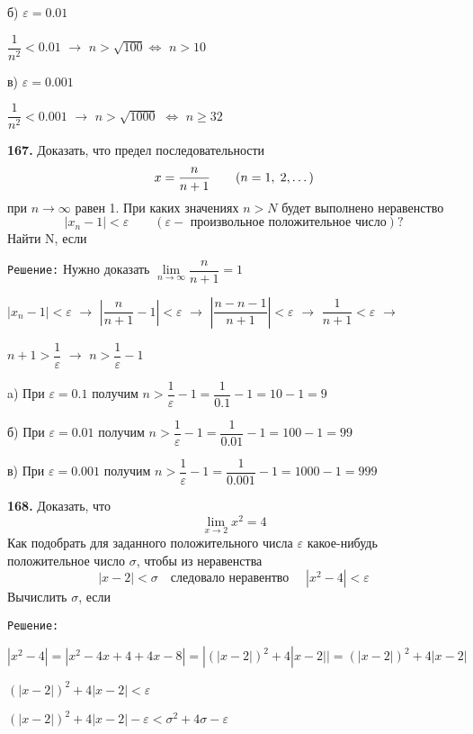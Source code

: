 \documentclass[12pt]{article}
\begin{document}
	\quad б) $\varepsilon = 0.01$
	
	\qquad $\dfrac{1}{n^2}<0.01$ $\longrightarrow$ $n>\sqrt{100}$\hspace{2mm}$\Leftrightarrow$ $n>10$\medskip
	
	\quad в) $ \varepsilon = 0.001$
	
	\qquad $\dfrac{1}{n^2}<0.001$ $\longrightarrow$ $n>\sqrt{1000}$ \hspace{2mm} $\Leftrightarrow$ $n\ge 32$
	\medskip
	
	{\bf 167.} Доказать, что предел последовательности
	\[
		x = \dfrac{n}{n+1}\qquad (n = 1,\hspace{1mm}2,\dots)
	\]
	при $n\longrightarrow\infty$ равен 1. При каких значениях $n>N$ будет выполнено неравенство
	\[
		|x_n-1| <\varepsilon\qquad (\varepsilon - \text{ произвольное положительное число})?
	\]
	Найти N, если 
	
	{\tt Решение:} Нужно доказать $\lim\limits_{n\to \infty} \dfrac{n}{n+1}=1$\medskip
	
	$|x_n - 1| <\varepsilon$ $\longrightarrow$ $\left|\dfrac{n}{n+1}-1\right|<\varepsilon$ $\longrightarrow$ $\left|\dfrac{n-n-1}{n+1}\right|<\varepsilon$ $\longrightarrow$ $\dfrac{1}{n+1}<\varepsilon$  $\longrightarrow$ 
	
	$n+1>\dfrac{1}{\varepsilon}$ $\longrightarrow$ $n > \dfrac{1}{\varepsilon}-1$
	
	\quad a) При $\varepsilon = 0.1$ получим $n>\dfrac{1}{\varepsilon}-1 = \dfrac{1}{0.1}-1 = 10-1 = 9$
	
	\quad б) При $\varepsilon = 0.01$ получим $n>\dfrac{1}{\varepsilon}-1 = \dfrac{1}{0.01}-1 = 100-1 = 99$
	
	\quad в) При $\varepsilon = 0.001$ получим $n>\dfrac{1}{\varepsilon}-1 = \dfrac{1}{0.001}-1 = 1000-1 = 999$
	\medskip
	
	{\bf 168.} Доказать, что
	\[
		\lim\limits_{x\to 2} x^2 = 4
	\]
	Как подобрать для заданного положительного числа $\varepsilon$ какое-нибудь положительное число $\sigma$, чтобы из неравенства
	\[
		|x-2|<\sigma \quad\text{следовало неравентво }\quad |x^2-4|<\varepsilon
	\]
	Вычислить $\sigma$, если 
	
	{\tt Решение:} 
	
	$
		|x^2-4| = |x^2-4x+4+4x-8| = |(|x-2|)^2+4|x-2|| = (|x-2|)^2+4|x-2|
	$
	
	$
		(|x-2|)^2+4|x-2|<\varepsilon
	$
	
	$
		(|x-2|)^2+4|x-2|-\varepsilon < \sigma^2+4\sigma-\varepsilon
	$
	
\end{document}

